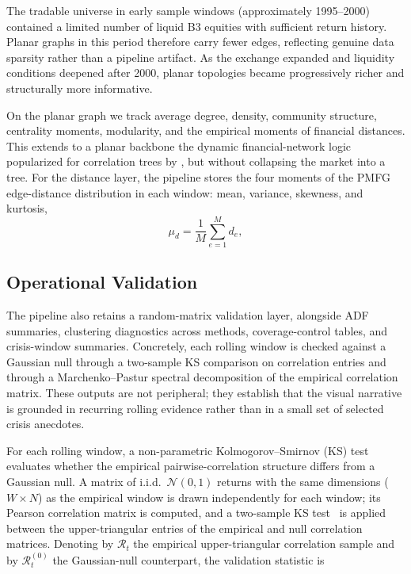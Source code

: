 \documentclass[a4paper,fleqn,review]{cas-sc}
\begin{document}
The tradable universe in early sample windows (approximately 1995--2000) contained a limited number of liquid B3 equities with sufficient return history. Planar graphs in this period therefore carry fewer edges, reflecting genuine data sparsity rather than a pipeline artifact. As the exchange expanded and liquidity conditions deepened after 2000, planar topologies became progressively richer and structurally more informative.

On the planar graph we track average degree, density, community structure, centrality moments, modularity, and the empirical moments of financial distances. This extends to a planar backbone the dynamic financial-network logic popularized for correlation trees by \citet{onnela2003dynamics}, but without collapsing the market into a tree. For the distance layer, the pipeline stores the four moments of the PMFG edge-distance distribution in each window: mean, variance, skewness, and kurtosis,
\begin{equation}
\label{eq:distance_moments}
\mu_d=\frac{1}{M}\sum_{e=1}^{M} d_e,
\end{equation}
\subsection{Operational Validation}

The pipeline also retains a random-matrix validation layer, alongside ADF summaries, clustering diagnostics across methods, coverage-control tables, and crisis-window summaries. Concretely, each rolling window is checked against a Gaussian null through a two-sample KS comparison on correlation entries and through a Marchenko--Pastur spectral decomposition of the empirical correlation matrix. These outputs are not peripheral; they establish that the visual narrative is grounded in recurring rolling evidence rather than in a small set of selected crisis anecdotes.

For each rolling window, a non-parametric Kolmogorov--Smirnov (KS) test evaluates whether the empirical pairwise-correlation structure differs from a Gaussian null. A matrix of i.i.d.\ $\mathcal{N}(0,1)$ returns with the same dimensions ($W \times N$) as the empirical window is drawn independently for each window; its Pearson correlation matrix is computed, and a two-sample KS test~\citep{kolmogorov1933,smirnov1948} is applied between the upper-triangular entries of the empirical and null correlation matrices. Denoting by $\mathcal{R}_t$ the empirical upper-triangular correlation sample and by $\mathcal{R}^{(0)}_t$ the Gaussian-null counterpart, the validation statistic is
\end{document}
